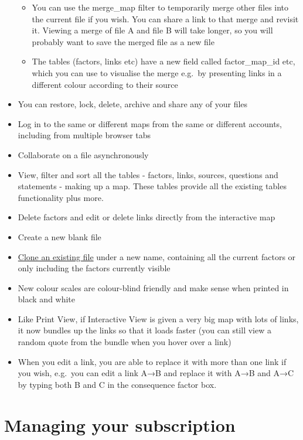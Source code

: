 \documentclass[
]{book}
\providecommand{\tightlist}{%
  \setlength{\itemsep}{0pt}\setlength{\parskip}{0pt}}
\begin{document}
\begin{itemize}
  \begin{itemize}
  \tightlist
  \item
    You can use the merge\_map filter to temporarily merge other files into the current file if you wish. You can share a link to that merge and revisit it. Viewing a merge of file A and file B will take longer, so you will probably want to save the merged file as a new file
  \item
    The tables (factors, links etc) have a new field called factor\_map\_id etc, which you can use to visualise the merge e.g.~by presenting links in a different colour according to their source
  \end{itemize}
\item
  You can restore, lock, delete, archive and share any of your files
\item
  Log in to the same or different maps from the same or different accounts, including from multiple browser tabs
\item
  Collaborate on a file asynchronously
\item
  View, filter and sort all the tables - factors, links, sources, questions and statements - making up a map. These tables provide all the existing tables functionality plus more.
\item
  Delete factors and edit or delete links directly from the interactive map
\item
  Create a new blank file
\item
  \protect\hyperlink{xown-copy}{Clone an existing file} under a new name, containing all the current factors or only including the factors currently visible
\item
  New colour scales are colour-blind friendly and make sense when printed in black and white
\item
  Like Print View, if Interactive View is given a very big map with lots of links, it now bundles up the links so that it loads faster (you can still view a random quote from the bundle when you hover over a link)
\item
  When you edit a link, you are able to replace it with more than one link if you wish, e.g.~you can edit a link A→B and replace it with A→B and A→C by typing both B and C in the consequence factor box.
\end{itemize}

\hypertarget{xmanage_your_subscription}{%
\chapter{Managing your subscription}\label{xmanage_your_subscription}}
\end{document}
